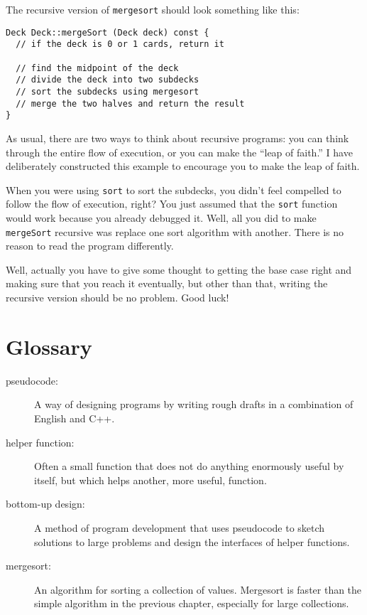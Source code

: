 The recursive version of {\tt mergesort} should look something
like this:

\begin{lstlisting}
Deck Deck::mergeSort (Deck deck) const {
  // if the deck is 0 or 1 cards, return it

  // find the midpoint of the deck
  // divide the deck into two subdecks
  // sort the subdecks using mergesort
  // merge the two halves and return the result
}
\end{lstlisting}
%
As usual, there are two ways to think about recursive programs:
you can think through the entire flow of execution, or you
can make the ``leap of faith.''  I have deliberately constructed
this example to encourage you to make the leap of faith.


When you were using {\tt sort} to sort the subdecks, you didn't
feel compelled to follow the flow of execution, right?  You just
assumed that the {\tt sort} function would work because you already
debugged it.  Well, all you did to make {\tt mergeSort} recursive was
replace one sort algorithm with another.  There is no reason to read
the program differently.

Well, actually you have to give some thought to getting the
base case right and making sure that you reach it eventually,
but other than that, writing the recursive version should be
no problem.  Good luck!

\section{Glossary}

\begin{description}

\item[pseudocode:]  A way of designing programs by writing
rough drafts in a combination of English and C++.

\item[helper function:]  Often a small function that does not
do anything enormously useful by itself, but which helps
another, more useful, function.

\item[bottom-up design:]  A method of program development that
uses pseudocode to sketch solutions to large problems and
design the interfaces of helper functions.

\item[mergesort:]  An algorithm for sorting a collection of
values.  Mergesort is faster than the simple algorithm in
the previous chapter, especially for large collections.



\end{description}

